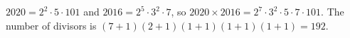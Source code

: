 $2020=2^2\cdot5\cdot101$ and $2016=2^5\cdot3^2\cdot7$, so $2020\times2016=2^7\cdot3^2\cdot5\cdot7\cdot101$. The number of divisors is $(7+1)(2+1)(1+1)(1+1)(1+1)=\boxed{192}$.
